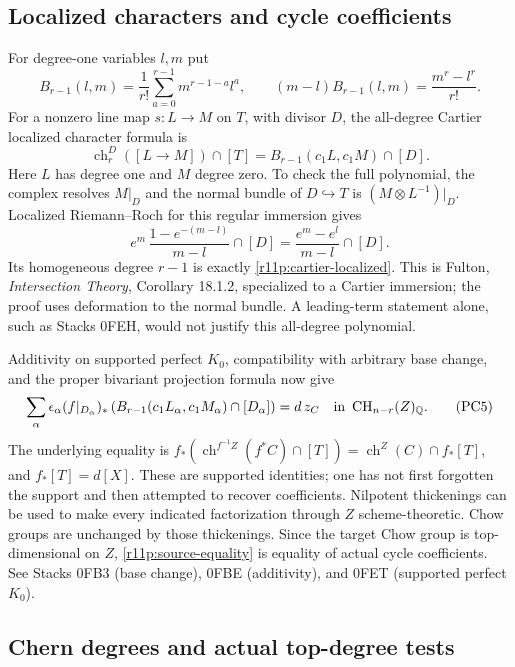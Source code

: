 \documentclass[11pt]{article}
\theoremstyle{definition}
\theoremstyle{remark}
\numberwithin{equation}{section}
\begin{document}
\subsection{Localized characters and cycle coefficients}

For degree-one variables $l,m$ put
\[
 B_{r-1}(l,m)=\frac1{r!}\sum_{a=0}^{r-1}m^{r-1-a}l^a,
 \qquad
                  (m-l)B_{r-1}(l,m)=\frac{m^r-l^r}{r!}.
\tag{PC3}\label{r11p:B-polynomial}
\]
For a nonzero line map $s:L\to M$ on $T$, with divisor $D$, the
all-degree Cartier localized character formula is
\[
 \operatorname{ch}^{D}_r([L\to M])\cap[T]
         =B_{r-1}(c_1L,c_1M)\cap[D].
\tag{PC4}\label{r11p:cartier-localized}
\]
Here $L$ has degree one and $M$ degree zero.  To check the full
polynomial, the complex resolves $M|_D$ and the normal bundle of
$D\hookrightarrow T$ is $(M\otimes L^{-1})|_D$.  Localized
Riemann--Roch for this regular immersion gives
\[
 e^m\,\frac{1-e^{-(m-l)}}{m-l}\cap[D]
                         =\frac{e^m-e^l}{m-l}\cap[D].
\]
Its homogeneous degree $r-1$ is exactly \eqref{r11p:cartier-localized}.
This is Fulton, \emph{Intersection Theory}, Corollary 18.1.2,
specialized to a Cartier immersion; the proof uses deformation to the
normal bundle.  A leading-term statement alone, such as Stacks 0FEH,
would not justify this all-degree polynomial.

Additivity on supported perfect $K_0$, compatibility with arbitrary
base change, and the proper bivariant projection formula now give
\[
 \sum_\alpha\epsilon_\alpha
    (f|_{D_\alpha})_*
       \left(B_{r-1}(c_1L_\alpha,c_1M_\alpha)\cap[D_\alpha]\right)
                              =d\,z_C
       \quad\hbox{in }\operatorname{CH}_{n-r}(Z)_{\mathbb Q}.
\tag{PC5}\label{r11p:source-equality}
\]
The underlying equality is
$f_*(\operatorname{ch}^{f^{-1}Z}(f^*C)\cap[T])
=\operatorname{ch}^Z(C)\cap f_*[T]$, and $f_*[T]=d[X]$.
These are supported identities; one has not first forgotten the
support and then attempted to recover coefficients.  Nilpotent
thickenings can be used to make every indicated factorization through
$Z$ scheme-theoretic.  Chow groups are unchanged by those thickenings.
Since the target Chow group is top-dimensional on $Z$,
\eqref{r11p:source-equality} is equality of actual cycle coefficients.
See Stacks 0FB3 (base change), 0FBE (additivity), and 0FET (supported
perfect $K_0$).

\subsection{Chern degrees and actual top-degree tests}
\end{document}
